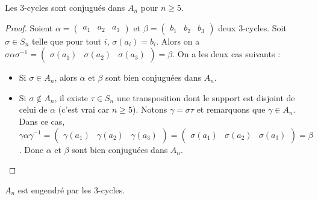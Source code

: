 





	\begin{lemma}
		\label{simplicite-du-groupe-alterne-1}
		Les $3$-cycles sont conjugués dans $A_n$ pour $n \geq 5$.
	\end{lemma}

	\begin{proof}
		Soient $\alpha = \begin{pmatrix} a_1 & a_2 & a_3 \end{pmatrix}$ et $\beta = \begin{pmatrix} b_1 & b_2 & b_3 \end{pmatrix}$ deux $3$-cycles. Soit $\sigma \in S_n$ telle que pour tout $i$, $\sigma(a_i) = b_i$. Alors on a $\sigma \alpha \sigma^{-1} = \begin{pmatrix} \sigma(a_1) & \sigma(a_2) & \sigma(a_3) \end{pmatrix} = \beta$. On a les deux cas suivants :
		\begin{itemize}
			\item Si $\sigma \in A_n$, alors $\alpha$ et $\beta$ sont bien conjuguées dans $A_n$.
			\item Si $\sigma \notin A_n$, il existe $\tau \in S_n$ une transposition dont le support est disjoint de celui de $\alpha$ (c'est vrai car $n \geq 5$). Notons $\gamma = \sigma \tau$ et remarquons que $\gamma \in A_n$. Dans ce cas, $\gamma \alpha \gamma^{-1} = \begin{pmatrix} \gamma(a_1) & \gamma(a_2) & \gamma(a_3) \end{pmatrix} = \begin{pmatrix} \sigma(a_1) & \sigma(a_2) & \sigma(a_3) \end{pmatrix} = \beta$. Donc $\alpha$ et $\beta$ sont bien conjuguées dans $A_n$.
		\end{itemize}
	\end{proof}

	\begin{lemma}
		\label{simplicite-du-groupe-alterne-2}
		$A_n$ est engendré par les $3$-cycles.
	\end{lemma}

